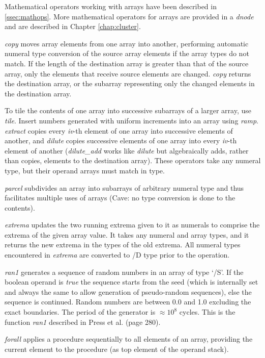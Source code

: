 Mathematical operators working with arrays have been described in \ref{ssec:mathops}. More mathematical operators for arrays are provided in a \emph{dnode} and are described in Chapter \ref{chap:cluster}.

\emph{copy} moves  array elements from one array into another, performing automatic numeral  type conversion of the source array elements if the array types do not match. If the length of the destination array is greater than that of the source array, only the elements that receive source elements are changed. \emph{copy} returns the destination array, or the subarray representing only the changed elements in the destination array.

To tile the contents of one array into successive subarrays of a larger array, use \emph{tile}. Insert numbers generated with uniform increments into an array using \emph{ramp}. \emph{extract} copies every \emph{iv}-th element of one array into successive elements of another, and \emph{dilute} copies successive elements of one array into every \emph{iv}-th element of another (\emph{dilute\_add} works like \emph{dilute} but algebraically adds, rather than copies, elements to the destination array). These operators take any numeral type, but their operand arrays must match in type.

\emph{parcel} subdivides an array into subarrays of arbitrary  numeral  type  and thus facilitates multiple  uses  of  arrays (Cave: no type conversion is done to the contents).

\emph{extrema} updates the two running extrema given to it as numerals to comprise the extrema of the given array value. It takes any numeral and array types, and it returns the new extrema in the types of the old extrema. All numeral types encountered in \emph{extrema} are converted to /D type prior to the operation.

\emph{ran1} generates a sequence of random numbers in an array of type `/S'. If the boolean operand is \emph{true} the sequence starts from the seed (which is internally set and always the same to allow generation of pseudo-random sequences), else the sequence is continued. Random numbers  are between 0.0 and 1.0 excluding the exact boundaries. The period of the generator is $\approx 10^8$ cycles. This is the function \emph{ran1} described in Press et al. (page 280).

\emph{forall} applies a procedure sequentially to all elements of an array, providing the current element to the procedure (as top element of the operand stack).

